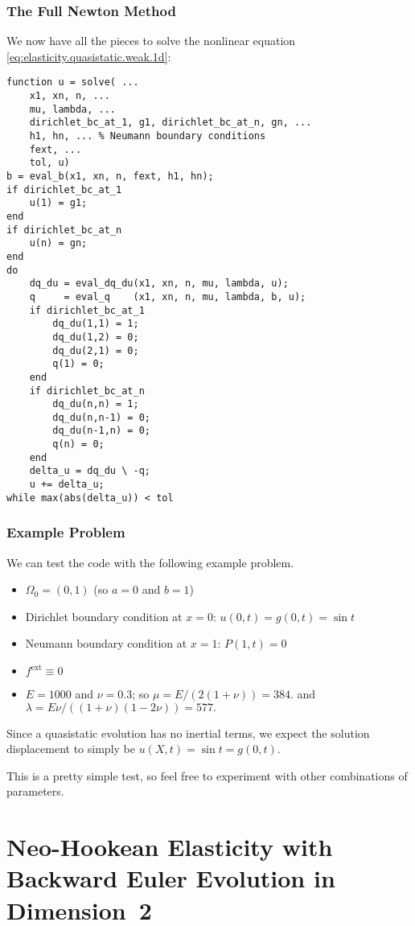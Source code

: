\subsubsection{The Full Newton Method}

We now have all the pieces to solve the nonlinear equation \eqref{eq:elasticity.quasistatic.weak.1d}:
\begin{verbatim}
function u = solve( ...
    x1, xn, n, ...
    mu, lambda, ...
    dirichlet_bc_at_1, g1, dirichlet_bc_at_n, gn, ...
    h1, hn, ... % Neumann boundary conditions
    fext, ...
    tol, u)
b = eval_b(x1, xn, n, fext, h1, hn);
if dirichlet_bc_at_1
    u(1) = g1;
end
if dirichlet_bc_at_n
    u(n) = gn;
end
do
    dq_du = eval_dq_du(x1, xn, n, mu, lambda, u);
    q     = eval_q    (x1, xn, n, mu, lambda, b, u);
    if dirichlet_bc_at_1
        dq_du(1,1) = 1;
        dq_du(1,2) = 0;
        dq_du(2,1) = 0;
        q(1) = 0;
    end
    if dirichlet_bc_at_n
        dq_du(n,n) = 1;
        dq_du(n,n-1) = 0;
        dq_du(n-1,n) = 0;
        q(n) = 0;
    end
    delta_u = dq_du \ -q;
    u += delta_u;
while max(abs(delta_u)) < tol
\end{verbatim}

\subsubsection{Example Problem}

We can test the code with the following example problem.
\begin{itemize}
\item $\Omega_0 = (0,1)$ (so $a = 0$ and $b = 1$)
\item Dirichlet boundary condition at $x = 0$: $u(0,t) = g(0,t) = \sin t$
\item Neumann boundary condition at $x = 1$: $P(1,t) = 0$
\item $f^{\text{ext}} \equiv 0$
\item $E = 1000$ and $\nu = 0.3$; so $\mu = E / (2 (1 + \nu)) = 384.$ and $\lambda = E \nu / ((1 + \nu) (1 - 2\nu)) = 577.$
\end{itemize}
Since a quasistatic evolution has no inertial terms, we expect the solution displacement to simply be $u(X,t) = \sin t = g(0,t)$.

This is a pretty simple test, so feel free to experiment with other combinations of parameters.

\section{Neo-Hookean Elasticity with Backward Euler Evolution in Dimension~2}

